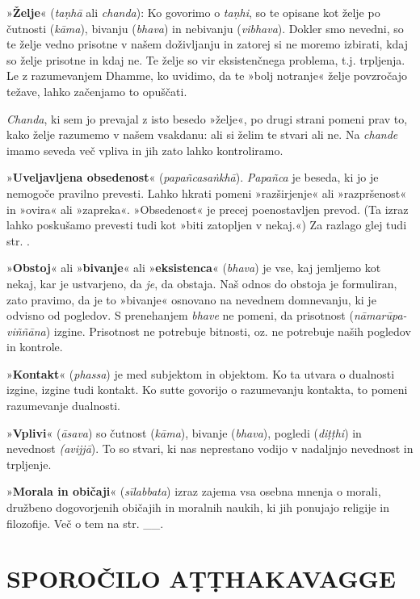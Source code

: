 »\textbf{Želje}« (\emph{taṇhā} ali \emph{chanda}): Ko govorimo o
\emph{taṇhi}, so te opisane kot želje po čutnosti (\emph{kāma}), bivanju
(\emph{bhava}) in nebivanju (\emph{vibhava}). Dokler smo nevedni, so te
želje vedno prisotne v našem doživljanju in zatorej si ne moremo
izbirati, kdaj so želje prisotne in kdaj ne. Te želje so vir
eksistenčnega problema, t.j. trpljenja. Le z razumevanjem Dhamme, ko
uvidimo, da te »bolj notranje« želje povzročajo težave, lahko začenjamo
to opuščati.

\emph{Chanda}, ki sem jo prevajal z isto besedo »želje«, po drugi strani
pomeni prav to, kako želje razumemo v našem vsakdanu: ali si želim te
stvari ali ne. Na \emph{chande} imamo seveda več vpliva in jih zato
lahko kontroliramo.

»\textbf{Uveljavljena obsedenost}« (\emph{papañcasaṅkhā}).
\emph{Papañca} je beseda, ki jo je nemogoče pravilno prevesti. Lahko
hkrati pomeni »razširjenje« ali »razpršenost« in »ovira« ali »zapreka«.
»Obsedenost« je precej poenostavljen prevod. (Ta izraz lahko poskušamo
prevesti tudi kot »biti zatopljen v nekaj.«) Za razlago glej tudi str. .

»\textbf{Obstoj}« ali »\textbf{bivanje}« ali »\textbf{eksistenca}«
(\emph{bhava}) je vse, kaj jemljemo kot nekaj, kar je ustvarjeno, da
\emph{je}, da obstaja. Naš odnos do obstoja je formuliran, zato pravimo,
da je to »bivanje« osnovano na nevednem domnevanju, ki je odvisno od
pogledov. S prenehanjem \emph{bhave} ne pomeni, da prisotnost
(\emph{nāmarūpa-viññāna}) izgine. Prisotnost ne potrebuje bitnosti, oz.
ne potrebuje naših pogledov in kontrole.

»\textbf{Kontakt}« (\emph{phassa}) je med subjektom in objektom. Ko ta
utvara o dualnosti izgine, izgine tudi kontakt. Ko sutte govorijo o
razumevanju kontakta, to pomeni razumevanje dualnosti.

»\textbf{Vplivi}« (\emph{āsava}) so čutnost (\emph{kāma}), bivanje
(\emph{bhava}), pogledi (\emph{diṭṭhi}) in nevednost \emph{(avijjā}). To
so stvari, ki nas neprestano vodijo v nadaljnjo nevednost in trpljenje.

»\textbf{Morala in običaji}« (\emph{sīlabbata}) izraz zajema vsa osebna
mnenja o morali, družbeno dogovorjenih običajih in moralnih naukih, ki
jih ponujajo religije in filozofije. Več o tem na str. \_\_.

\section{SPOROČILO AṬṬHAKAVAGGE}

